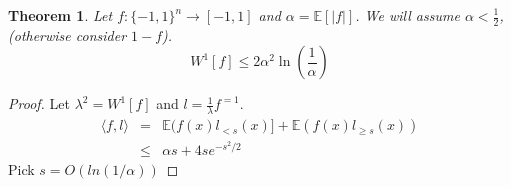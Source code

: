 \documentclass{sig-alternate}
\newtheorem{theorem}{Theorem}[section]
\begin{document}
\begin{theorem}
Let $f:\{-1,1\}^n \rightarrow [-1,1]$ and $\alpha = \mathbb{E}[|f|]$. We will assume $\alpha < \frac{1}{2}$, (otherwise consider $1 - f$). 
\[W^1[f] \leq 2\alpha^2\ln(\frac{1}{\alpha})\]
\end{theorem}
\begin{proof}
Let $\lambda^2 = W^1[f]$ and $l = \frac{1}{\lambda}f^{=1}$.
\begin{eqnarray*}
\langle f, l\rangle & = & \mathbb{E}(f(x)l_{<s}(x)]  + \mathbb{E}(f(x)l_{\geq s}(x))  \\
 & \leq & \alpha s + 4se^{-s^2/2}
 \end{eqnarray*}
 Pick $s = O(ln(1/\alpha))$
\end{proof}



\end{document}
